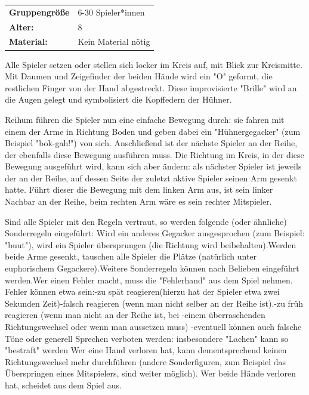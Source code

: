 \begin{table}[H]
\begin{tabular}{>{\bfseries}lp{8cm}}
   Gruppengröße   & 6-30 Spieler*innen\\
    Alter: & 8\\
    Material: & Kein Material nötig\\
\end{tabular}
\end{table} 

Alle Spieler setzen oder stellen sich locker im Kreis auf, mit Blick zur Kreismitte. Mit Daumen und Zeigefinder der beiden Hände wird ein "O" geformt, die restlichen Finger von der Hand abgestreckt. Diese improvisierte "Brille" wird an die Augen gelegt und symbolisiert die Kopffedern der Hühner. \newline \newline

Reihum führen die Spieler nun eine einfache Bewegung durch: sie fahren mit einem der Arme in Richtung Boden und geben dabei ein "Hühnergegacker" (zum Beispiel "bok-gah!") von sich. Anschließend ist der nächste Spieler an der Reihe, der ebenfalls diese Bewegung ausführen muss. Die Richtung im Kreis, in der diese Bewegung ausgeführt wird, kann sich aber ändern: als nächster Spieler ist jeweils der an der Reihe, auf dessen Seite der zuletzt aktive Spieler seinen Arm gesenkt hatte. Führt dieser die Bewegung mit dem linken Arm aus, ist sein linker Nachbar an der Reihe, beim rechten Arm wäre es sein rechter Mitspieler. \newline \newline

Sind alle Spieler mit den Regeln vertraut, so werden folgende (oder ähnliche) Sonderregeln eingeführt: \newline 
Wird ein anderes Gegacker ausgesprochen (zum Beispiel: "buut"), wird ein Spieler übersprungen (die Richtung wird beibehalten).Werden beide Arme gesenkt, tauschen alle Spieler die Plätze (natürlich unter euphorischem Gegackere).Weitere Sonderregeln können nach Belieben eingeführt werden.Wer einen Fehler macht, muss die "Fehlerhand" aus dem Spiel nehmen. Fehler können etwa sein:-zu spät reagieren(hierzu hat der Spieler etwa zwei Sekunden Zeit)-falsch reagieren (wenn man nicht selber an der Reihe ist).-zu früh reagieren (wenn man nicht an der Reihe ist, bei -einem überraschenden Richtungswechsel oder wenn man aussetzen muss)
-eventuell können auch falsche Töne oder generell Sprechen verboten werden: insbesondere "Lachen" kann so "bestraft" werden Wer eine Hand verloren hat, kann dementsprechend keinen Richtungswechsel mehr durchführen (andere Sonderfiguren, zum Beispiel das Überspringen eines Mitspielers, sind weiter möglich). Wer beide Hände verloren hat, scheidet aus dem Spiel aus.\\



